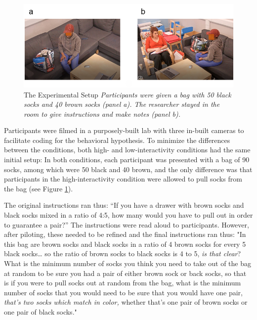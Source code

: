 \documentclass[twocolumn, serif, empirical, authordate]{jote-article}
\begin{document}
\begin{figure}

 \includegraphics[width=\columnwidth]{media/image1.png} 
\caption{The Experimental Setup \hspace{\textwidth}
\emph{Participants were given a bag with 50 black socks and 40 brown socks \emph{(panel a)}. The researcher stayed in the room to give instructions and make notes \emph{(panel b)}.}} 
\label{fig:figure1}
\vskip-3pt
\end{figure}

Participants were filmed in a purposely-built lab with three in-built cameras to facilitate coding for the behavioral hypothesis. To minimize the differences between the conditions, both high- and low-interactivity conditions had the same initial setup: In both conditions, each participant was presented with a bag of 90 socks, among which were 50 black and 40 brown, and the only difference was that participants in the high-interactivity condition were allowed to pull socks from the bag (see Figure \ref{fig:figure1}). 




The original instructions ran thus: ``If you have a drawer with brown socks and black socks mixed in a ratio of 4:5, how many would you have to pull out in order to guarantee a pair?'' The instructions were read aloud to participants. However, after piloting, these needed to be refined and the final instructions ran thus: "In this bag are brown socks and black socks in a ratio of 4 brown socks for every 5 black socks\ldots{} so the ratio of brown socks to black socks is 4 to 5, \emph{is that clear}? What is the minimum number of socks you think you need to take out of the bag at random to be sure you had a pair of either brown sock or back socks, so that is if you were to pull socks out at random from the bag, what is the minimum number of socks that you would need to be sure that you would have one pair, \emph{that's two socks which match in color,} whether that's one pair of brown socks or one pair of black socks."
\end{document}
